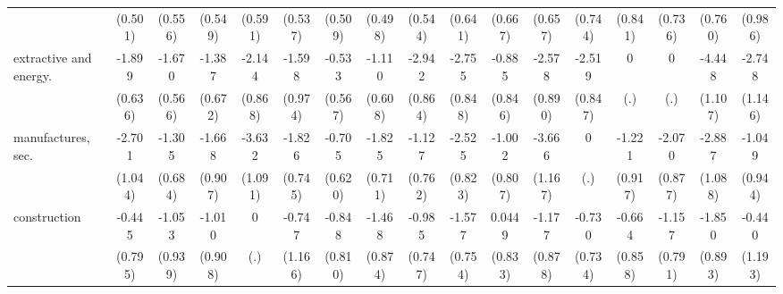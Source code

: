 {\begin{tabular}{l*{16}{c}}
                    &     (0.501)         &     (0.556)         &     (0.549)         &     (0.591)         &     (0.537)         &     (0.509)         &     (0.498)         &     (0.544)         &     (0.641)         &     (0.667)         &     (0.657)         &     (0.744)         &     (0.841)         &     (0.736)         &     (0.760)         &     (0.986)         \\
[1em]
extractive and energy.&      -1.899\sym{**} &      -1.670\sym{**} &      -1.387\sym{*}  &      -2.144\sym{*}  &      -1.598         &      -0.533         &      -1.110         &      -2.942\sym{***}&      -2.755\sym{**} &      -0.885         &      -2.578\sym{**} &      -2.519\sym{**} &           0         &           0         &      -4.448\sym{***}&      -2.748\sym{*}  \\
                    &     (0.636)         &     (0.566)         &     (0.672)         &     (0.868)         &     (0.974)         &     (0.567)         &     (0.608)         &     (0.864)         &     (0.848)         &     (0.846)         &     (0.890)         &     (0.847)         &         (.)         &         (.)         &     (1.107)         &     (1.146)         \\
[1em]
manufactures, sec.  &      -2.701\sym{**} &      -1.305         &      -1.668         &      -3.632\sym{***}&      -1.826\sym{*}  &      -0.705         &      -1.825\sym{*}  &      -1.127         &      -2.525\sym{**} &      -1.002         &      -3.666\sym{**} &           0         &      -1.221         &      -2.070\sym{*}  &      -2.887\sym{**} &      -1.049         \\
                    &     (1.044)         &     (0.684)         &     (0.907)         &     (1.091)         &     (0.745)         &     (0.620)         &     (0.711)         &     (0.762)         &     (0.823)         &     (0.807)         &     (1.167)         &         (.)         &     (0.917)         &     (0.877)         &     (1.088)         &     (0.944)         \\
[1em]
construction        &      -0.445         &      -1.053         &      -1.010         &           0         &      -0.747         &      -0.848         &      -1.468         &      -0.985         &      -1.577\sym{*}  &      0.0449         &      -1.177         &      -0.730         &      -0.664         &      -1.157         &      -1.850\sym{*}  &      -0.440         \\
                    &     (0.795)         &     (0.939)         &     (0.908)         &         (.)         &     (1.166)         &     (0.810)         &     (0.874)         &     (0.747)         &     (0.754)         &     (0.833)         &     (0.878)         &     (0.734)         &     (0.858)         &     (0.791)         &     (0.893)         &     (1.193)         \\

\end{tabular}}
